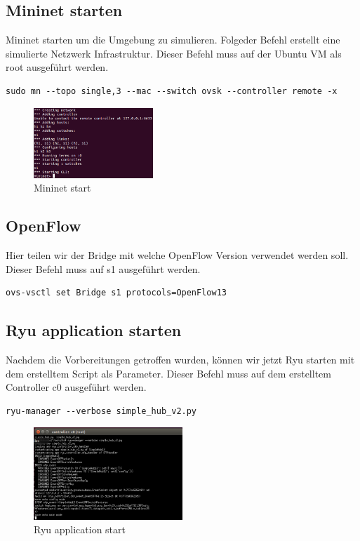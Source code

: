 \documentclass[a4,12pt]{scrartcl}
\begin{document}
\subsection{Mininet starten}
Mininet starten um die Umgebung zu simulieren. Folgeder Befehl erstellt eine simulierte Netzwerk Infrastruktur. Dieser Befehl muss auf der Ubuntu VM als root ausgeführt werden. 
\begin{lstlisting}
sudo mn --topo single,3 --mac --switch ovsk --controller remote -x
\end{lstlisting}
\begin{figure} [H]
	\begin{center}
	\includegraphics[width=0.40\textwidth]{./pictures/mininet.png}
	\caption{Mininet start}
	\label{x}
	\end{center}
\end{figure} 

\subsection{OpenFlow}
Hier teilen wir der Bridge mit welche OpenFlow Version verwendet werden soll. Dieser Befehl muss auf s1 ausgeführt werden. 
\begin{lstlisting}
ovs-vsctl set Bridge s1 protocols=OpenFlow13
\end{lstlisting}

\subsection{Ryu application starten}
Nachdem die Vorbereitungen getroffen wurden, können wir jetzt Ryu starten mit dem erstelltem Script als Parameter. Dieser Befehl muss auf dem erstelltem Controller c0 ausgeführt werden. 
\begin{lstlisting}
ryu-manager --verbose simple_hub_v2.py
\end{lstlisting}
\begin{figure} [H]
	\begin{center}
	\includegraphics[width=0.50\textwidth]{./pictures/ryu_start_simple_hub.png}
	\caption{Ryu application start}
	\label{x}
	\end{center}
\end{figure} 
\end{document}
